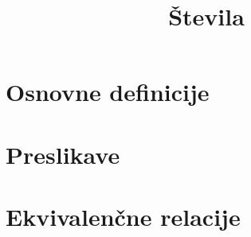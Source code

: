 \documentclass[11pt]{article}
\title{Števila}
\begin{document}
    \maketitle
    \pagebreak

    \section{Osnovne definicije}
    
    \pagebreak

    \section{Preslikave}
    
    \pagebreak

    \section{Ekvivalenčne relacije}
    
    \pagebreak
\end{document}
